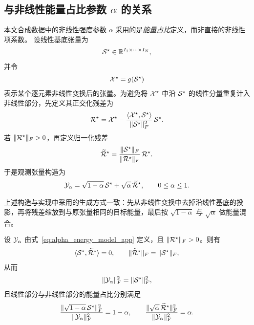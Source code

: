 \subsection{与非线性能量占比参数 $\alpha$ 的关系}
\label{app:alpha_energy_ratio}

本文合成数据中的非线性强度参数 $\alpha$ 采用的是\emph{能量占比}定义，而非直接的非线性项系数。
设线性基底张量为
\begin{equation}
\mathcal{S}^\star \in \mathbb{R}^{I_1\times\cdots\times I_N},
\end{equation}
并令
\begin{equation}
\mathcal{X}^\star = g(\mathcal{S}^\star)
\end{equation}
表示某个逐元素非线性变换后的张量。为避免将 $\mathcal{X}^\star$ 中沿 $\mathcal{S}^\star$ 的线性分量重复计入非线性部分，先定义其正交化残差为
\begin{equation}
\mathcal{R}^\star
=
\mathcal{X}^\star
-
\frac{\langle \mathcal{X}^\star,\mathcal{S}^\star\rangle}{\|\mathcal{S}^\star\|_F^2}\,\mathcal{S}^\star.
\label{eq:orthogonal_residual_app}
\end{equation}
若 $\|\mathcal{R}^\star\|_F>0$，再定义归一化残差
\begin{equation}
\widetilde{\mathcal{R}}^\star
=
\frac{\|\mathcal{S}^\star\|_F}{\|\mathcal{R}^\star\|_F}\,\mathcal{R}^\star.
\label{eq:normalized_residual_app}
\end{equation}
于是观测张量构造为
\begin{equation}
\mathcal{Y}_\alpha
=
\sqrt{1-\alpha}\,\mathcal{S}^\star
+
\sqrt{\alpha}\,\widetilde{\mathcal{R}}^\star,
\qquad
0\le \alpha\le 1.
\label{eq:alpha_energy_model_app}
\end{equation}

上述构造与实现中采用的生成方式一致：先从非线性变换中去掉沿线性基底的投影，再将残差缩放到与原张量相同的目标能量，最后按 $\sqrt{1-\alpha}$ 与 $\sqrt{\alpha}$ 做能量混合。

\begin{proposition}[能量占比解释]
\label{prop:alpha_energy_ratio_app}
设 $\mathcal{Y}_\alpha$ 由式~\eqref{eq:alpha_energy_model_app} 定义，且 $\|\mathcal{R}^\star\|_F>0$。则有
\begin{equation}
\langle \mathcal{S}^\star,\widetilde{\mathcal{R}}^\star\rangle = 0,
\qquad
\|\widetilde{\mathcal{R}}^\star\|_F = \|\mathcal{S}^\star\|_F,
\end{equation}
从而
\begin{equation}
\|\mathcal{Y}_\alpha\|_F^2=\|\mathcal{S}^\star\|_F^2,
\label{eq:energy_preserved_app}
\end{equation}
且线性部分与非线性部分的能量占比分别满足
\begin{equation}
\frac{\|\sqrt{1-\alpha}\,\mathcal{S}^\star\|_F^2}{\|\mathcal{Y}_\alpha\|_F^2}=1-\alpha,
\qquad
\frac{\|\sqrt{\alpha}\,\widetilde{\mathcal{R}}^\star\|_F^2}{\|\mathcal{Y}_\alpha\|_F^2}=\alpha.
\label{eq:energy_ratio_exact_app}
\end{equation}
\end{proposition}

